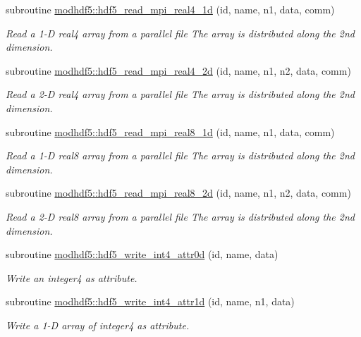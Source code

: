 \begin{DoxyCompactItemize}
subroutine \hyperlink{namespacemodhdf5_a7c2f69141e8a85768536e7c8f79f6348}{modhdf5\+::hdf5\+\_\+read\+\_\+mpi\+\_\+real4\+\_\+1d} (id, name, n1, data, comm)
\begin{DoxyCompactList}\small\item\em Read a 1-\/D real4 array from a parallel file The array is distributed along the 2nd dimension. \end{DoxyCompactList}\item 
subroutine \hyperlink{namespacemodhdf5_a406b07a6320d4dd08a12ca4b8d6b9e9d}{modhdf5\+::hdf5\+\_\+read\+\_\+mpi\+\_\+real4\+\_\+2d} (id, name, n1, n2, data, comm)
\begin{DoxyCompactList}\small\item\em Read a 2-\/D real4 array from a parallel file The array is distributed along the 2nd dimension. \end{DoxyCompactList}\item 
subroutine \hyperlink{namespacemodhdf5_afaf6a2a85551a1a7e9638d597c39dc32}{modhdf5\+::hdf5\+\_\+read\+\_\+mpi\+\_\+real8\+\_\+1d} (id, name, n1, data, comm)
\begin{DoxyCompactList}\small\item\em Read a 1-\/D real8 array from a parallel file The array is distributed along the 2nd dimension. \end{DoxyCompactList}\item 
subroutine \hyperlink{namespacemodhdf5_a29c6c1a0c3de14678ed8eebe304b3255}{modhdf5\+::hdf5\+\_\+read\+\_\+mpi\+\_\+real8\+\_\+2d} (id, name, n1, n2, data, comm)
\begin{DoxyCompactList}\small\item\em Read a 2-\/D real8 array from a parallel file The array is distributed along the 2nd dimension. \end{DoxyCompactList}\item 
subroutine \hyperlink{namespacemodhdf5_a1f5aac5704c10accbb39476926a4a7aa}{modhdf5\+::hdf5\+\_\+write\+\_\+int4\+\_\+attr0d} (id, name, data)
\begin{DoxyCompactList}\small\item\em Write an integer4 as attribute. \end{DoxyCompactList}\item 
subroutine \hyperlink{namespacemodhdf5_a41e511ab23277132cad7aa447804eee4}{modhdf5\+::hdf5\+\_\+write\+\_\+int4\+\_\+attr1d} (id, name, n1, data)
\begin{DoxyCompactList}\small\item\em Write a 1-\/D array of integer4 as attribute. \end{DoxyCompactList}\item 

\end{DoxyCompactItemize}

